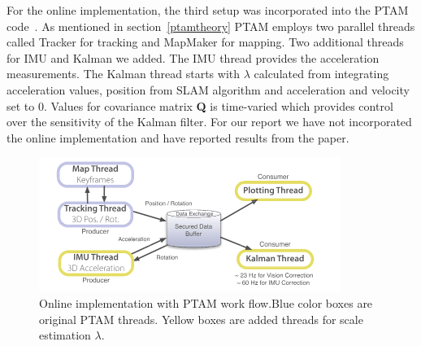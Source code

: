For the online implementation, the third setup was incorporated into the PTAM code~\cite{ptamcode}. As mentioned in section~\ref{ptamtheory} PTAM employs two parallel threads called Tracker for tracking and MapMaker for mapping. Two additional threads for IMU and Kalman we added. The IMU thread provides the acceleration measurements. The Kalman thread starts with $\lambda$ calculated from integrating acceleration values, position from SLAM algorithm and acceleration and velocity set to 0. Values for covariance matrix \textbf{Q} is time-varied which provides control over the sensitivity of the Kalman filter. For our report we have not incorporated the online implementation and have reported results from the paper. 

\begin{figure}
  \includegraphics[width=\textwidth]{./figures/onlineEKF.png}
\caption{Online implementation with PTAM work flow.Blue color boxes are original PTAM threads. Yellow boxes are added threads for scale estimation $\lambda$.~\cite{nutzi2011fusion}}
\label{fig:ekf2}       %
\end{figure}
